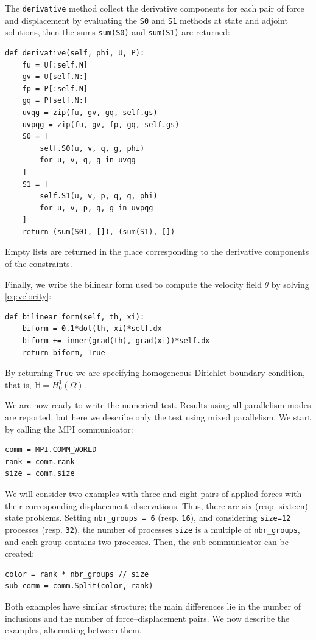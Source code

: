 \documentclass[preprint,9pt]{elsarticle}
\begin{document}
The \texttt{derivative} method collect the derivative components
for each pair of force and displacement
by evaluating the \texttt{S0} and \texttt{S1} methods
at state and adjoint solutions,
then the sums \texttt{sum(S0)} and \texttt{sum(S1)} are returned: 
\begin{lstlisting}
def derivative(self, phi, U, P):
	fu = U[:self.N]
	gv = U[self.N:]
	fp = P[:self.N]
	gq = P[self.N:]
	uvqg = zip(fu, gv, gq, self.gs)
	uvpqg = zip(fu, gv, fp, gq, self.gs)
	S0 = [
		self.S0(u, v, q, g, phi)
		for u, v, q, g in uvqg
	]
	S1 = [
		self.S1(u, v, p, q, g, phi)
		for u, v, p, q, g in uvpqg
	]
	return (sum(S0), []), (sum(S1), [])
\end{lstlisting}
Empty lists are returned in the place corresponding
to the derivative components of the constraints.

Finally, we write the bilinear form used to compute
the velocity field $\theta$ by solving \eqref{eq:velocity}:
\begin{lstlisting}
def bilinear_form(self, th, xi):
    biform = 0.1*dot(th, xi)*self.dx
	biform += inner(grad(th), grad(xi))*self.dx    
	return biform, True
\end{lstlisting}
By returning \texttt{True} we are specifying homogeneous Dirichlet boundary condition,
that is, $\mathbb{H}=H^1_0(\Omega)$.

We are now ready to write the numerical test. 
Results using all parallelism modes are reported,
but here we describe only the test using mixed parallelism.
We start by calling the MPI communicator:
\begin{lstlisting}
comm = MPI.COMM_WORLD
rank = comm.rank
size = comm.size
\end{lstlisting}

We will consider two examples with three and eight pairs of
applied forces with their corresponding displacement observations.
Thus, there are six (resp. sixteen) state problems.
Setting \texttt{nbr\_groups = 6} (resp. \texttt{16}),
and considering \texttt{size=12} processes (resp. \texttt{32}),
the number of processes \texttt{size} is a multiple of \texttt{nbr\_groups},
and each group contains two processes.
Then, the sub-communicator can be created:
\begin{lstlisting}
color = rank * nbr_groups // size
sub_comm = comm.Split(color, rank)
\end{lstlisting}

Both examples have similar structure; the main differences lie in
the number of inclusions and the number of force--displacement pairs. 
We now describe the examples, alternating between them.
\end{document}

